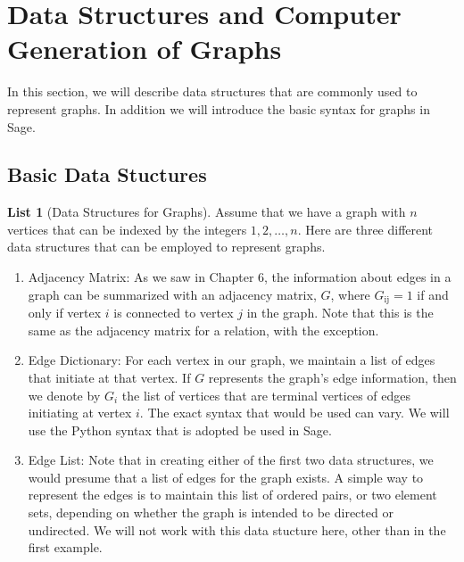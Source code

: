 \documentclass[10pt,]{book}
\theoremstyle{plain}
\theoremstyle{definition}
\theoremstyle{definition}
\theoremstyle{definition}
\theoremstyle{definition}
\theoremstyle{definition}
\newtheorem{listwrapper}[theorem]{List}
\numberwithin{equation}{section}
\begin{document}
\section[Data Structures and Computer Generation of Graphs]{Data Structures and Computer Generation of Graphs}\label{s-data-structures-for-graphs}
\typeout{************************************************}
\typeout{************************************************}
In this section, we will describe data structures that are commonly used to represent graphs. In addition we will introduce the basic syntax for
graphs in Sage.%
\typeout{************************************************}
\typeout{************************************************}
\subsection[Basic Data Stuctures]{Basic Data Stuctures}\label{ss-graph-data-structures}
\begin{listwrapper}[Data Structures for Graphs]\label{list-2}
\typeout{************************************************}
\typeout{************************************************}
Assume that we have a graph with \(n\) vertices that can be indexed by the integers \(1, 2, \dots, n\).  Here are three different data structures that can be employed to represent graphs.%
\leavevmode%
\begin{enumerate}
\item\hypertarget{li-23}{}Adjacency Matrix:  As we saw in Chapter 6, the information about edges in a graph can be summarized with an adjacency
matrix, \(G\), where \(G_{\text{ij}}=1\) if and only if vertex \(i\) is connected to vertex \(j\) in the graph.  Note
that this is the same as the adjacency matrix for a relation, with the exception.%
\item\hypertarget{li-24}{}Edge Dictionary:  For each vertex in our graph, we maintain a list of edges that
initiate at that vertex. If \(G\) represents the graph's edge information, then we denote by \(G_i\) the list of vertices that are terminal vertices  of edges initiating at vertex \(i\). The exact syntax that would be used can vary.  We will use the Python syntax that is adopted be used in Sage.%
\item\hypertarget{li-25}{}Edge List:  Note that in creating either of the first two data structures, we would presume that a list of
edges for the graph exists. A simple way to represent the edges is to maintain this list of ordered pairs, or two element sets, depending on whether the graph is intended to be directed or undirected.  We will not work with this data stucture here, other than in the first example.%
\end{enumerate}
\end{listwrapper}
\end{document}
